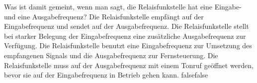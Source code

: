     {Was ist damit gemeint, wenn man sagt, die Relaisfunkstelle hat eine Eingabe- und eine Ausgabefrequenz?}
    {Die Relaisfunkstelle empfängt auf der Eingabefrequenz und sendet auf der Ausgabefrequenz.}
    {Die Relaisfunkstelle stellt bei starker Belegung der Eingabefrequenz eine zusätzliche Ausgabefrequenz zur Verfügung.}
    {Die Relaisfunkstelle benutzt eine Eingabefrequenz zur Umsetzung des empfangenen Signals und die Ausgabefrequenz zur Fernsteuerung.}
    {Die Relaisfunkstelle muss auf der Ausgabefrequenz mit einem Tonruf geöffnet werden, bevor sie auf der Eingabefrequenz in Betrieb gehen kann.}
    {false}{false}